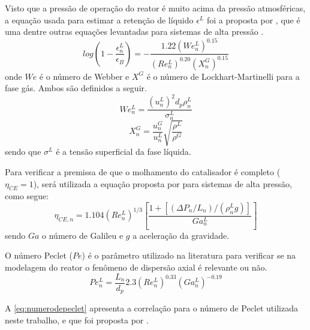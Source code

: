 
Visto que a pressão de operação do reator é muito acima da pressão atmosféricas,
a equação usada para estimar a retenção de líquido $\epsilon^L$ foi a proposta
por , que é uma dentre outras
equações levantadas para sistemas de alta pressão \cite{Ancheyta2011}.
\begin{equation}
log \left (1-\dfrac{\epsilon_{n}^L}{\epsilon_B} \right) =
-\dfrac{\num{1,22}(We_{n}^L)^{\num{0,15}}}{(Re_{n}^L)^{\num{0,20}}(X_{n}^G)^{\num{0,15}}}
\label{eq:epsilonL}
\end{equation}
onde $We$ é o número de Webber e $X^G$ é o número de Lockhart-Martinelli
para a fase gás. Ambos são definidos a seguir.
\begin{equation}
We_{n}^L = \dfrac{(u_{n}^L)^2d_p\rho_{n}^L}{\sigma_{n}^L}
\label{eq:webber}
\end{equation}
\begin{equation}
X_{n}^G = \dfrac{u_{n}^G}{u_n^L} \sqrt{\dfrac{\rho^L}{\rho^G}}
\label{eq:X}
\end{equation}
sendo que $\sigma^L$ é a tensão superficial da fase líquida.


Para verificar a premissa de que o molhamento do catalisador é completo
($\eta_{CE} = 1$), será utilizada a equação proposta por
 para sistemas de alta pressão, como segue:
\begin{equation}
\eta_{CE,n} = \num{1,104}(Re_n^L)^{1/3} \left [
\dfrac{1 + [(\Delta P_n/L_{n})/(\rho_{n}^L g)]}{Ga_{n}^{L}} \right ]
\label{eq:molhamento}
\end{equation}
sendo $Ga$ o número de Galileu e $g$ a aceleração da gravidade.


O número Peclet ($Pe$) é o parâmetro utilizado na literatura para verificar
se na modelagem do reator o fenômeno de dispersão axial é relevante ou não.
\begin{equation}
Pe_n^L = \dfrac{L_n}{d_p}
\num{2,3}(Re_n^L)^{\num{0,33}}(Ga_{n}^{L})^{\num{-0,19}}
\label{eq:numerodepeclet}
\end{equation}

A \autoref{eq:numerodepeclet} apresenta a correlação para o número de
Peclet utilizada neste trabalho, e que foi proposta por
.


